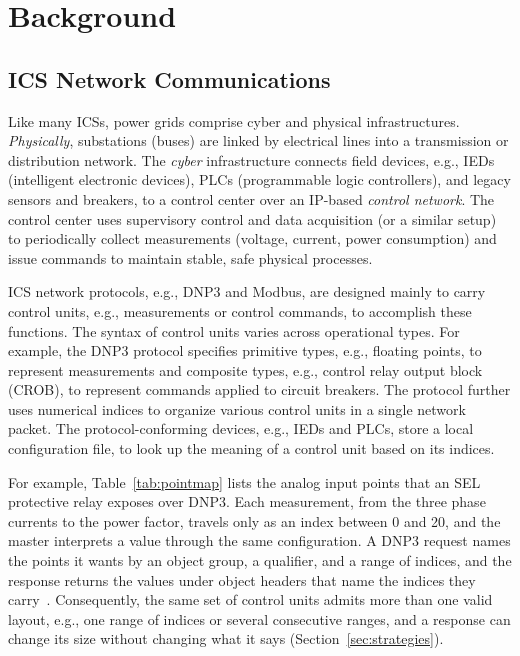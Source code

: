 \documentclass[conference]{IEEEtran}
\begin{document}
\section{Background}
\label{sec:background}

\subsection{ICS Network Communications}
Like many ICSs, power grids comprise cyber and physical infrastructures. \textit{Physically}, substations (buses) are linked by electrical lines into a transmission or distribution network. The \textit{cyber} infrastructure connects field devices, e.g., IEDs (intelligent electronic devices), PLCs (programmable logic controllers), and legacy sensors and breakers, to a control center over an IP-based \textit{control network}. The control center uses supervisory control and data acquisition (or a similar setup) to periodically collect measurements (voltage, current, power consumption) and issue commands to maintain stable, safe physical processes.

ICS network protocols, e.g., DNP3 and Modbus, are designed mainly to carry control units, e.g., measurements or control commands, to accomplish these functions. The syntax of control units varies across operational types. For example, the DNP3 protocol specifies primitive types, e.g., floating points, to represent measurements and composite types, e.g., control relay output block (CROB), to represent commands applied to circuit breakers. The protocol further uses numerical indices to organize various control units in a single network packet. The protocol-conforming devices, e.g., IEDs and PLCs, store a local configuration file, to look up the meaning of a control unit based on its indices.

For example, Table~\ref{tab:pointmap} lists the analog input points that an SEL protective relay exposes over DNP3. Each measurement, from the three phase currents to the power factor, travels only as an index between 0 and 20, and the master interprets a value through the same configuration. A DNP3 request names the points it wants by an object group, a qualifier, and a range of indices, and the response returns the values under object headers that name the indices they carry~\cite{dnp3std}. Consequently, the same set of control units admits more than one valid layout, e.g., one range of indices or several consecutive ranges, and a response can change its size without changing what it says (Section~\ref{sec:strategies}).
\end{document}
